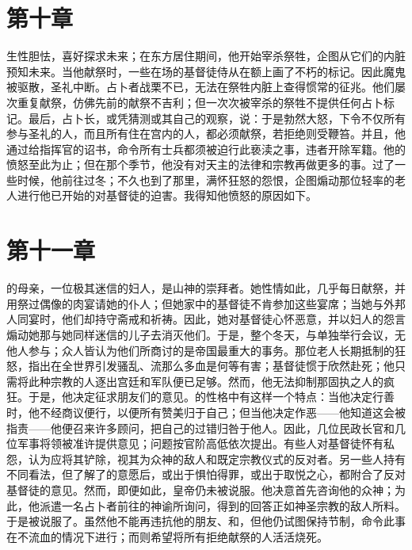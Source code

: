 
\section{第十章}

生性胆怯，喜好探求未来；在东方居住期间，他开始宰杀祭牲，企图从它们的内脏预知未来。当他献祭时，一些在场的基督徒侍从在额上画了不朽的标记。因此魔鬼被驱散，圣礼中断。占卜者战栗不已，无法在祭牲内脏上查得惯常的征兆。他们屡次重复献祭，仿佛先前的献祭不吉利；但一次次被宰杀的祭牲不提供任何占卜标记。最后，占卜长，或凭猜测或其自己的观察，说：于是勃然大怒，下令不仅所有参与圣礼的人，而且所有住在宫内的人，都必须献祭，若拒绝则受鞭笞。并且，他通过给指挥官的诏书，命令所有士兵都须被迫行此亵渎之事，违者开除军籍。他的愤怒至此为止；但在那个季节，他没有对天主的法律和宗教再做更多的事。过了一些时候，他前往过冬；不久也到了那里，满怀狂怒的怨恨，企图煽动那位轻率的老人进行他已开始的对基督徒的迫害。我得知他愤怒的原因如下。\par


\section{第十一章}

的母亲，一位极其迷信的妇人，是山神的崇拜者。她性情如此，几乎每日献祭，并用祭过偶像的肉宴请她的仆人；但她家中的基督徒不肯参加这些宴席；当她与外邦人同宴时，他们却持守斋戒和祈祷。因此，她对基督徒心怀恶意，并以妇人的怨言煽动她那与她同样迷信的儿子去消灭他们。于是，整个冬天，与单独举行会议，无他人参与；众人皆认为他们所商讨的是帝国最重大的事务。那位老人长期抵制的狂怒，指出在全世界引发骚乱、流那么多血是何等有害；基督徒惯于欣然赴死；他只需将此种宗教的人逐出宫廷和军队便已足够。然而，他无法抑制那固执之人的疯狂。于是，他决定征求朋友们的意见。的性格中有这样一个特点：当他决定行善时，他不经商议便行，以便所有赞美归于自己；但当他决定作恶——他知道这会被指责——他便召来许多顾问，把自己的过错归咎于他人。因此，几位民政长官和几位军事将领被准许提供意见；问题按官阶高低依次提出。有些人对基督徒怀有私怨，认为应将其铲除，视其为众神的敌人和既定宗教仪式的反对者。另一些人持有不同看法，但了解了的意愿后，或出于惧怕得罪，或出于取悦之心，都附合了反对基督徒的意见。然而，即便如此，皇帝仍未被说服。他决意首先咨询他的众神；为此，他派遣一名占卜者前往的神谕所询问，得到的回答正如神圣宗教的敌人所料。于是被说服了。虽然他不能再违抗他的朋友、和，但他仍试图保持节制，命令此事在不流血的情况下进行；而则希望将所有拒绝献祭的人活活烧死。\par


